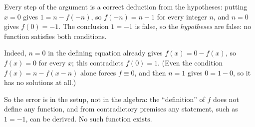Every step of the argument is a correct deduction from the hypotheses: putting $x=0$ gives $1=n-f(-n)$, so $f(-n)=n-1$ for every integer $n$, and $n=0$ gives $f(0)=-1$. The conclusion $1=-1$ is false, so the \emph{hypotheses} are false: no function satisfies both conditions.

Indeed, $n=0$ in the defining equation already gives $f(x)=0-f(x)$, so $f(x)=0$ for every $x$; this contradicts $f(0)=1$. (Even the condition $f(x)=n-f(x-n)$ alone forces $f\equiv0$, and then $n=1$ gives $0=1-0$, so it has no solutions at all.)

So the error is in the setup, not in the algebra: the ``definition'' of $f$ does not define any function, and from contradictory premises any statement, such as $1=-1$, can be derived. $\boxed{\text{No such function exists.}}$
